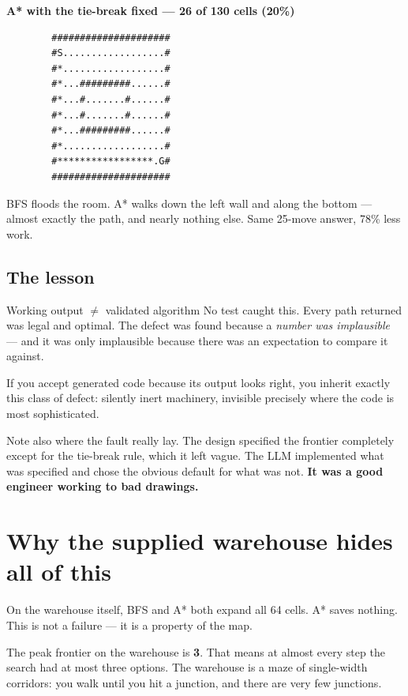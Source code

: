 \documentclass[11pt,a4paper]{article}
\begin{document}
\noindent\textbf{A* with the tie-break fixed --- 26 of 130 cells (20\%)}
\begin{verbatim}
        #####################
        #S..................#
        #*..................#
        #*...#########......#
        #*...#.......#......#
        #*...#.......#......#
        #*...#########......#
        #*..................#
        #*****************.G#
        #####################
\end{verbatim}

BFS floods the room. A* walks down the left wall and along the bottom --- almost
exactly the path, and nearly nothing else. Same 25-move answer, 78\% less work.

\subsection{The lesson}

\begin{keyidea}{Working output $\neq$ validated algorithm}
No test caught this. Every path returned was legal and optimal. The defect was
found because a \emph{number was implausible} --- and it was only implausible
because there was an expectation to compare it against.

If you accept generated code because its output looks right, you inherit exactly
this class of defect: silently inert machinery, invisible precisely where the
code is most sophisticated.
\end{keyidea}

Note also where the fault really lay. The design specified the frontier
completely except for the tie-break rule, which it left vague. The LLM
implemented what was specified and chose the obvious default for what was not.
\textbf{It was a good engineer working to bad drawings.}

\section{Why the supplied warehouse hides all of this}

On the warehouse itself, BFS and A* both expand all 64 cells. A* saves nothing.
This is not a failure --- it is a property of the map.

The peak frontier on the warehouse is \textbf{3}. That means at almost every step
the search had at most three options. The warehouse is a maze of single-width
corridors: you walk until you hit a junction, and there are very few junctions.
\end{document}
